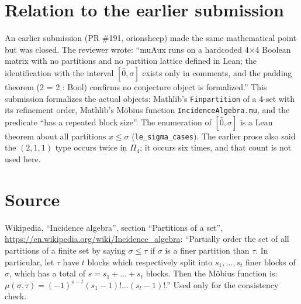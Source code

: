 \documentclass[11pt]{article}
\theoremstyle{definition}
\begin{document}
\section{Relation to the earlier submission}
An earlier submission (PR \#191, orionsheep) made the same mathematical point but was closed. The
reviewer wrote: ``muAux runs on a hardcoded 4$\times$4 Boolean matrix with no partitions and no
partition lattice defined in Lean; the identification with the interval $[\hat0, \sigma]$ exists
only in comments, and the padding theorem (2 = 2 : Bool) confirms no conjecture object is
formalized.'' This submission formalizes the actual objects: Mathlib's \texttt{Finpartition} of a
4-set with its refinement order, Mathlib's M\"obius function \texttt{IncidenceAlgebra.mu}, and the
predicate ``has a repeated block size''. The enumeration of $[\hat0,\sigma]$ is a Lean theorem
about all partitions $x\le\sigma$ (\texttt{le\_sigma\_cases}). The earlier prose also said the
$(2,1,1)$ type occurs twice in $\Pi_4$; it occurs six times, and that count is not used here.

\section*{Source}
Wikipedia, ``Incidence algebra'', section ``Partitions of a set'',
\url{https://en.wikipedia.org/wiki/Incidence_algebra}: ``Partially order the set of all partitions
of a finite set by saying $\sigma \le \tau$ if $\sigma$ is a finer partition than $\tau$. In
particular, let $\tau$ have $t$ blocks which respectively split into $s_1, \dots, s_t$ finer blocks
of $\sigma$, which has a total of $s = s_1 + \dots + s_t$ blocks. Then the M\"obius function is:
$\mu(\sigma,\tau)=(-1)^{s-t}(s_1-1)!\dots(s_t-1)!$.'' Used only for the consistency check.
\end{document}
